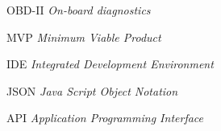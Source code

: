 \begin{basedescript}{\desclabelstyle{\pushlabel}\desclabelwidth{6em}}
\item[{OBD-II}] \textit{On-board diagnostics}
\item[{MVP}] \textit{Minimum Viable Product}
\item[{IDE}] \textit{Integrated Development Environment}
\item[{JSON}] \textit{Java Script Object Notation}
\item[{API}] \textit{Application Programming Interface}
\end{basedescript}